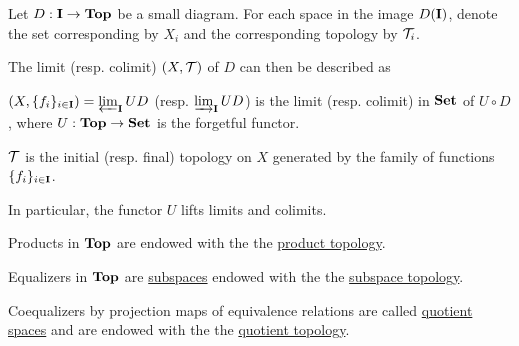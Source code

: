 \begin{proposition}\label{thm:initial_final_topology_limit}\cite{nLab:top}
  Let $D: \operatorname{\mathbf{I}} \to \operatorname{\mathbf{Top}}$ be a small diagram. For each space in the image $D(\operatorname{\mathbf{I}})$, denote the set corresponding by $X_i$ and the corresponding topology by $\mathcal T_i$.

  The limit (resp. colimit) $(X, \mathcal T)$ of $D$ can then be described as
  \begin{defenum}
    \item $(X, \{ f_i \}_{i \in \operatorname{\mathbf{I}}}) = \varprojlim_{\operatorname{\mathbf{I}}} UD$ (resp. $\varinjlim_{\operatorname{\mathbf{I}}} UD$) is the limit (resp. colimit) in $\operatorname{\mathbf{Set}}$ of $U \circ D$, where $U: \operatorname{\mathbf{Top}} \to \operatorname{\mathbf{Set}}$ is the forgetful functor.
    \item $\mathcal T$ is the initial (resp. final) topology on $X$ generated by the family of functions $\{ f_i \}_{i \in \operatorname{\mathbf{I}}}$.
  \end{defenum}

  In particular, the functor $U$ lifts limits and colimits.
\end{proposition}

\begin{example}\label{ex:initial_final_topology}\cite{nLab:top}
  \begin{defenum}
    \item Products in $\operatorname{\mathbf{Top}}$ are endowed with the the \uline{product topology}.
    \item Equalizers in $\operatorname{\mathbf{Top}}$ are \uline{subspaces} endowed with the the \uline{subspace topology}.
    \item Coequalizers by projection maps of equivalence relations are called \uline{quotient spaces} and are endowed with the the \uline{quotient topology}.
  \end{defenum}
\end{example}
